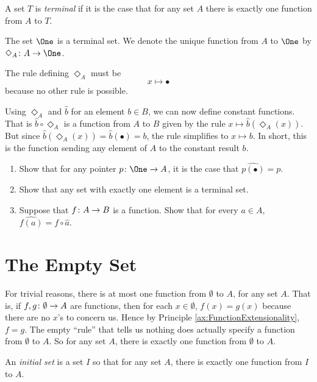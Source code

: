 \begin{defn}\label{def:terminal}
	A set $T$ is \emph{terminal} if it is the case that for any set $A$ there is exactly one function from $A$ to $T$.
\end{defn}

\begin{principle}
	The set $\One$ is a terminal set. 
	We denote the unique function from $A$ to $\One$ by $\fromto {\Diamond_A}{A}\One$.
	
	The rule defining $\Diamond_A$ must be
	\[x\mapsto\bullet\]
	because no other rule is possible. 
\end{principle}

Using $\Diamond_A$ and $\hat{b}$ for an element $b\in B$, we can now define constant functions. 
That is $\hat{b}\circ\Diamond_A$ is a function from $A$ to $B$ given by the rule
$x\mapsto \hat{b}(\Diamond_A(x))$. But since $\hat{b}(\Diamond_A(x))= \hat{b}(\bullet) = b$, the rule simplifies to $x\mapsto b$. 
In short, this is the function sending any element of $A$ to the constant result $b$. 

\begin{exercises}
	\begin{enumerate}
		\item Show that for any pointer $\fromto p\One A$, it is the case that $\widehat{p(\bullet)}=p$.
		\item Show that any set with exactly one element is a terminal set.
		\item Suppose that ${f}\colon{A}\to{B}$ is a function. Show that for every $a\in A$, $\widehat{f(a)} = f\circ \hat{a}$.
	\end{enumerate}
\end{exercises}

\section{The Empty Set}

For trivial reasons, there is at most one function from $\emptyset$ to $A$,
for any set $A$. That is,  if ${f,g}\colon{\emptyset}\to{A}$ are functions, then
for each $x\in\emptyset$, $f(x)=g(x)$ because there are no $x$'s to concern us. Hence by Principle \ref{ax:FunctionExtensionality}, $f=g$. The empty ``rule'' that tells us nothing does actually specify a function from $\emptyset$ to $A$. So for any set $A$, there is exactly one function from $\emptyset$ to $A$.

\begin{defn}
	An \emph{initial set} is a set $I$ so that for any set $A$, there is exactly one function from $I$ to $A$.
\end{defn}

